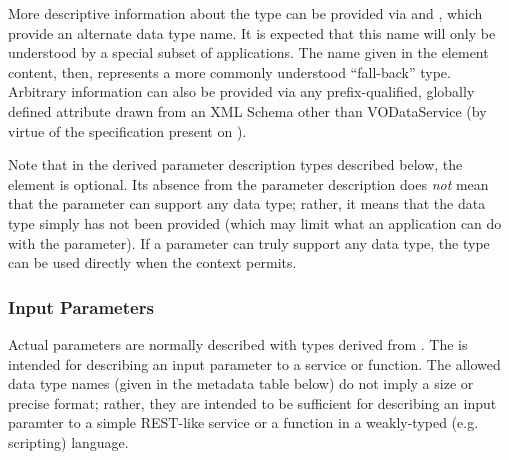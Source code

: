 \documentclass[11pt,a4paper]{ivoa}
\begin{document}
More descriptive information about the type can be provided via
 and , which
provide an alternate data type name.  It is expected that this name
will only be understood by a special subset of applications.  The name
given in the element content, then, represents a more commonly
understood “fall-back” type.   Arbitrary information can also be
provided via any prefix-qualified, globally defined attribute drawn
from an XML Schema other than VODataService (by virtue of the
 specification present
on ).





Note that in the derived parameter description types described below,
the  element is optional.  Its absence
from the parameter description does \emph{not} mean that the
parameter can support any data type; rather, it means that the data
type simply has not been provided (which may limit what an application
can do with the parameter).  If a parameter can truly support any data
type, the  type can be used directly when the
context permits.  


\subsubsection{Input Parameters}
\label{sect:inputparam}


Actual parameters are normally described with types derived from
.  The  is intended
for describing an input parameter to a service or function.  The
allowed data type names (given in the metadata table below) do not
imply a size or precise format; rather, they are intended to be
sufficient for describing an input paramter to a simple REST-like
service or a function in a weakly-typed (e.g. scripting) language.  
\end{document}
